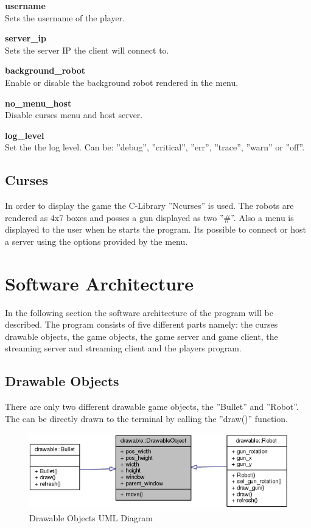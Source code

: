 \documentclass[12pt]{report}
\begin{document}
\textbf{username} \\
Sets the username of the player.

\textbf{server\_ip} \\
Sets the server IP the client will connect to.

\textbf{background\_robot} \\
Enable or disable the background robot rendered in the menu.

\textbf{no\_menu\_host} \\
Disable curses menu and host server.

\textbf{log\_level} \\
Set the the log level. Can be: ''debug'', ''critical'', ''err'', ''trace'', ''warn'' or ''off''.

\subsection{Curses}

In order to display the game the C-Library ''Ncurses'' is used. The robots are rendered as 4x7 boxes and posses a gun displayed as two ''\#''. Also a menu is displayed to the user when he starts the program. Its possible to connect or host a server using the options provided by the menu.

\section{Software Architecture}

In the following section the software architecture of the program will be described. The program consists of five different parts namely: the curses drawable objects, the game objects, the game server and game client, the streaming server and streaming client and the players program.

\subsection{Drawable Objects}
There are only two different drawable game objects, the ''Bullet'' and ''Robot''. The can be directly drawn to the terminal by calling the ''draw()'' function.

\begin{figure}[h]
\centering
\includegraphics[scale = 0.5]{images/DrawableObject_graph.png}
\caption{Drawable Objects UML Diagram}
\medskip
\end{figure}
\end{document}
